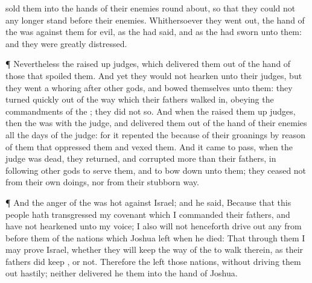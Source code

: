 {sold them into the
hands of their
enemies round
about, so that they
could not any
longer
stand
before their
enemies.
Whithersoever they went
out, the
hand of the
{} was against them for
evil, as the
{} had
said, and as the
{} had
sworn unto them: and they were
greatly
distressed.
\par }{\PP {}¶ Nevertheless the
{} raised
up
judges, which
delivered them out of the
hand of those that
spoiled them.
And yet they would not
hearken unto their
judges, but they went a
whoring
after
other
gods, and
bowed themselves unto them: they
turned
quickly out of the
way which their
fathers walked
in,
obeying the
commandments of the
{};
{} they
did not so.
And when the
{}
raised them up
judges, then the
{} was with the
judge, and
delivered them out of the
hand of their
enemies all the
days of the
judge: for it
repented the
{}
because of their
groanings by reason of them that
oppressed them and
vexed them.
And it came to pass, when the
judge was
dead,
{} they
returned, and
corrupted
{} more than their
fathers, in
following
other
gods to
serve them, and to bow
down unto them; they
ceased not from their own
doings, nor from their
stubborn
way.
\par }{\PP {}¶ And the
anger of the
{} was
hot against
Israel; and he
said, Because that this
people hath
transgressed my
covenant which I
commanded their
fathers, and have not
hearkened unto my
voice;
I also will not
henceforth drive
out
any from
before them of the
nations which
Joshua
left when he
died:
That through them I may
prove
Israel, whether they will
keep the
way of the
{} to
walk therein, as their
fathers did
keep
{}, or not.
Therefore the
{}
left those
nations,
without driving them
out
hastily; neither
delivered he them into the
hand of
Joshua.

}
